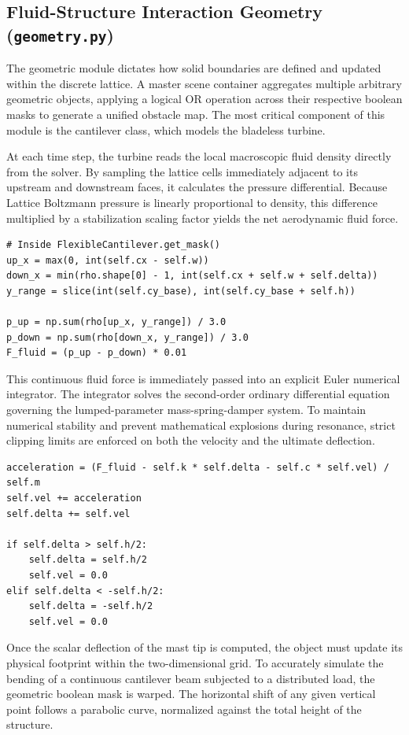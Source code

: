 \documentclass[11pt,a4paper]{article}
\begin{document}
\subsection{Fluid-Structure Interaction Geometry (\texttt{geometry.py})}
The geometric module dictates how solid boundaries are defined and updated within the discrete lattice. A master scene container aggregates multiple arbitrary geometric objects, applying a logical OR operation across their respective boolean masks to generate a unified obstacle map. The most critical component of this module is the cantilever class, which models the bladeless turbine.

At each time step, the turbine reads the local macroscopic fluid density directly from the solver. By sampling the lattice cells immediately adjacent to its upstream and downstream faces, it calculates the pressure differential. Because Lattice Boltzmann pressure is linearly proportional to density, this difference multiplied by a stabilization scaling factor yields the net aerodynamic fluid force.

\begin{lstlisting}[style=pystyle]
# Inside FlexibleCantilever.get_mask()
up_x = max(0, int(self.cx - self.w))
down_x = min(rho.shape[0] - 1, int(self.cx + self.w + self.delta))
y_range = slice(int(self.cy_base), int(self.cy_base + self.h))

p_up = np.sum(rho[up_x, y_range]) / 3.0
p_down = np.sum(rho[down_x, y_range]) / 3.0
F_fluid = (p_up - p_down) * 0.01 
\end{lstlisting}

This continuous fluid force is immediately passed into an explicit Euler numerical integrator. The integrator solves the second-order ordinary differential equation governing the lumped-parameter mass-spring-damper system. To maintain numerical stability and prevent mathematical explosions during resonance, strict clipping limits are enforced on both the velocity and the ultimate deflection.

\begin{lstlisting}[style=pystyle]
acceleration = (F_fluid - self.k * self.delta - self.c * self.vel) / self.m
self.vel += acceleration
self.delta += self.vel

if self.delta > self.h/2:
    self.delta = self.h/2
    self.vel = 0.0
elif self.delta < -self.h/2:
    self.delta = -self.h/2
    self.vel = 0.0
\end{lstlisting}

Once the scalar deflection of the mast tip is computed, the object must update its physical footprint within the two-dimensional grid. To accurately simulate the bending of a continuous cantilever beam subjected to a distributed load, the geometric boolean mask is warped. The horizontal shift of any given vertical point follows a parabolic curve, normalized against the total height of the structure.
\end{document}
